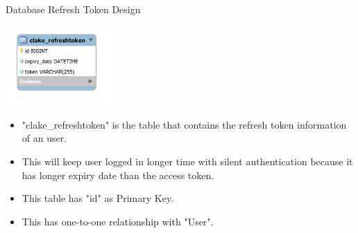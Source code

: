\begin{table}[H]
  \centering
  \caption{Database Refresh Token Design}
  \label{tbl:dbRefreshToken}
  \includegraphics[width=0.3\textwidth]{images/DatabaseRefreshTokenDesign.PNG}
\end{table}
\begin{itemize}
    \item "clake\_refreshtoken" is the table that contains the refresh token information of an user.
    \item This will keep user logged in longer time with silent authentication because it has longer expiry date than the access token. 
    \item This table has "id" as Primary Key.
    \item This has one-to-one relationship with "User".
\end{itemize}

